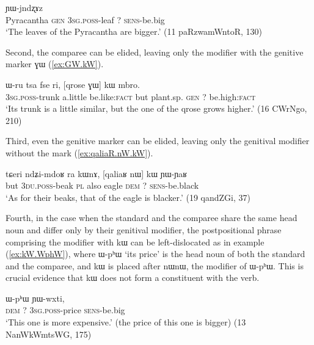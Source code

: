 \documentclass[oldfontcommands,oneside,a4paper,11pt]{article}
\newcommand{\ipa}[1]{{\phon #1}} %
\begin{document}
\begin{exe}
\ex \label{ex:GW.WjwaR.kW}
\gll 
[\ipa{tɤru}  	\ipa{ɣɯ}  	\ipa{ɯ-jwaʁ}]  	\ipa{kɯ}  	\ipa{ɲɯ-jndʐɤz}  \\
Pyracantha \textsc{gen} \textsc{3sg.poss}-leaf ?{ } \textsc{sens}-be.big \\
\glt `The leaves of the Pyracantha are bigger.' (11 paRzwamWntoR, 130)
 \end{exe}
 
Second,  the comparee can be elided, leaving only the modifier with the genitive marker \ipa{ɣɯ} (\ref{ex:GW.kW}).  

\begin{exe}
\ex \label{ex:GW.kW}
\gll 
\ipa{ɯ-ru}  	\ipa{tsa}  	\ipa{fse}  	\ipa{ri,}  	[\ipa{qrose}  	\ipa{ɣɯ}]  	\ipa{kɯ}  	\ipa{mbro.}  \\
\textsc{3sg.poss}-trunk a.little be.like:\textsc{fact} but plant.sp. \textsc{gen} ?{ } be.high:\textsc{fact} \\
\glt `Its  trunk is a little similar, but the one of the \ipa{qrose} grows higher.' (16 CWrNgo,  210)
\end{exe}

Third, even the genitive marker can be elided, leaving only the genitival modifier without the mark (\ref{ex:qaliaR.nW.kW}).

\begin{exe}
\ex \label{ex:qaliaR.nW.kW}
\gll 
\ipa{tɕeri}  	\ipa{ndʑi-mdoʁ}  	\ipa{ra}  	\ipa{kɯnɤ,}  	[\ipa{qaliaʁ}  	\ipa{nɯ}]  	\ipa{kɯ}  	\ipa{ɲɯ-ɲaʁ}  \\
but \textsc{3du.poss}-beak \textsc{pl} also eagle \textsc{dem} ?{ } \textsc{sens}-be.black \\
\glt `As for their beaks, that of the eagle is blacker.' (19 qandZGi, 37)
\end{exe}

Fourth, in the case when   the standard and the comparee share the same head noun and differ only by their genitival modifier, the postpositional phrase comprising the modifier with \ipa{kɯ} can be left-dislocated as in example (\ref{ex:kW.WphW}), where \ipa{ɯ-pʰɯ} `its price' is the head noun of both the standard and the comparee, and \ipa{kɯ} is placed after \ipa{nɯnɯ}, the  modifier of   \ipa{ɯ-pʰɯ}.  This is crucial evidence that \ipa{kɯ} does not form a constituent with the verb.

 \begin{exe}
\ex \label{ex:kW.WphW}
\gll 
[\ipa{nɯnɯ}]  	\ipa{kɯ}  	\ipa{ɯ-pʰɯ}  	\ipa{ɲɯ-wxti,}  \\
\textsc{dem} ?{ } \textsc{3sg.poss}-price \textsc{sens}-be.big \\
\glt `This one is more expensive.' (the price of this one is bigger) (13 NanWkWmtsWG, 175)
\end{exe}
\end{document}
